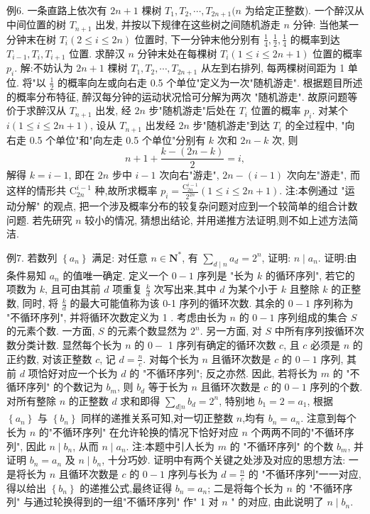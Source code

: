 例6. 一条直路上依次有 $2 n+1$ 棵树 $T_1, T_2, \cdots, T_{2 n+1}(n$ 为给定正整数). 一个醉汉从中间位置的树 $T_{n+1}$ 出发, 并按以下规律在这些树之间随机游走 $n$ 分钟: 当他某一分钟末在树 $T_i(2 \leqslant i \leqslant 2 n)$ 位置时, 下一分钟末他分别有 $\frac{1}{4}, \frac{1}{2}, \frac{1}{4}$ 的概率到达 $T_{i-1}, T_i, T_{i+1}$ 位置.
求醉汉 $n$ 分钟末处在每棵树 $T_i(1 \leqslant i \leqslant 2 n+1)$ 位置的概率 $p_i$.
解:不妨认为 $2 n+1$ 棵树 $T_1, T_2, \cdots, T_{2 n+1}$ 从左到右排列, 每两棵树间距为 1 单位.
将"以 $\frac{1}{2}$ 的概率向左或向右走 0.5 个单位"定义为一次"随机游走". 根据题目所述的概率分布特征, 醉汉每分钟的运动状况恰可分解为两次 "随机游走". 故原问题等价于求醉汉从 $T_{n+1}$ 出发, 经 $2 n$ 步"随机游走"后处在 $T_i$ 位置的概率 $p_i$.
对某个 $i(1 \leqslant i \leqslant 2 n+1)$, 设从 $T_{n+1}$ 出发经 $2 n$ 步"随机游走"到达 $T_i$ 的全过程中, "向右走 0.5 个单位"和"向左走 0.5 个单位"分别有 $k$ 次和 $2 n-k$ 次, 则
$$
n+1+\frac{k-(2 n-k)}{2}=i,
$$
解得 $k=i-1$, 即在 $2 n$ 步中 $i-1$ 次向右"游走", $2 n-(i-1)$ 次向左"游走", 而这样的情形共 $\mathrm{C}_{2 n}^{i-1}$ 种,故所求概率 $p_i=\frac{\mathrm{C}_{2 n}^{i-1}}{2^{2 n}}(1 \leqslant i \leqslant 2 n+1)$.
注:本例通过 "运动分解" 的观点, 把一个涉及概率分布的较复杂问题对应到一个较简单的组合计数问题.
若先研究 $n$ 较小的情况, 猜想出结论, 并用递推方法证明,则不如上述方法简洁.



例7. 若数列 $\left\{a_n\right\}$ 满足: 对任意 $n \in \mathbf{N}^*$, 有 $\sum_{d \mid n} a_d=2^n$, 证明: $n \mid a_n$.
证明:由条件易知 $a_n$ 的值唯一确定.
定义一个 $0-1$ 序列是 "长为 $k$ 的循环序列", 若它的项数为 $k$, 且可由其前 $d$ 项重复 $\frac{k}{d}$ 次写出来,其中 $d$ 为某个小于 $k$ 且整除 $k$ 的正整数, 同时, 将 $\frac{k}{d}$ 的最大可能值称为该 0-1 序列的循环次数.
其余的 $0-1$ 序列称为 "不循环序列", 并将循环次数定义为 1 .
考虑由长为 $n$ 的 $0-1$ 序列组成的集合 $S$ 的元素个数.
一方面, $S$ 的元素个数显然为 $2^n$.
另一方面, 对 $S$ 中所有序列按循环次数分类计数.
显然每个长为 $n$ 的 $0-$ 1 序列有确定的循环次数 $c$, 且 $c$ 必须是 $n$ 的正约数, 对该正整数 $c$, 记 $d=\frac{n}{c}$. 对每个长为 $n$ 且循环次数是 $c$ 的 $0-1$ 序列, 其前 $d$ 项恰好对应一个长为 $d$ 的 "不循环序列"; 反之亦然.
因此, 若将长为 $m$ 的 "不循环序列" 的个数记为 $b_m$, 则 $b_d$ 等于长为 $n$ 且循环次数是 $c$ 的 $0-1$ 序列的个数.
对所有整除 $n$ 的正整数 $d$ 求和即得 $\sum_{d|n} b_d=2^n$, 特别地 $b_1=2=a_1$, 根据 $\left\{a_n\right\}$ 与 $\left\{b_n\right\}$ 同样的递推关系可知,对一切正整数 $n$,均有 $b_n=a_n$.
注意到每个长为 $n$ 的"不循环序列" 在允许轮换的情况下恰好对应 $n$ 个两两不同的"不循环序列", 因此 $n \mid b_n$, 从而 $n \mid a_n$.
注:本题中引人长为 $m$ 的 "不循环序列" 的个数 $b_m$, 并证明 $b_n=a_n$ 及 $n \mid b_n$, 十分巧妙.
证明中有两个关键之处涉及对应的思想方法: 一是将长为 $n$ 且循环次数是 $c$ 的 $0-1$ 序列与长为 $d=\frac{n}{c}$ 的 "不循环序列"一一对应, 得以给出 $\left\{b_n\right\}$ 的递推公式,最终证得 $b_n=a_n$; 二是将每个长为 $n$ 的 "不循环序列" 与通过轮换得到的一组"不循环序列" 作" 1 对 $n$ " 的对应, 由此说明了 $n \mid b_n$.




